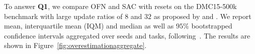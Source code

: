 

To answer \textbf{Q1}, we compare OFN and SAC with resets on the DMC15-500k benchmark with large update ratios of $8$ and $32$ as proposed by \textcite{nikishin2022primacy} and  \textcite{schwarzer2023bigger}.  We report mean, interquartile mean (IQM) and median as well as $95\%$ bootstrapped confidence intervals aggregated over seeds and tasks,  following~\textcite{agarwal2021deep}. The results are shown in Figure~\ref{fig:overestimationaggregate}.

